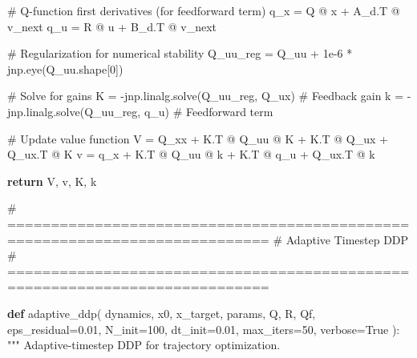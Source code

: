 \documentclass[
  letterpaper,
  DIV=11,
  numbers=noendperiod]{scrartcl}
\newenvironment{Shaded}{\begin{snugshade}}{\end{snugshade}}
\newcommand{\CommentTok}[1]{\textcolor[rgb]{0.37,0.37,0.37}{#1}}
\newcommand{\ControlFlowTok}[1]{\textcolor[rgb]{0.00,0.23,0.31}{\textbf{#1}}}
\newcommand{\DecValTok}[1]{\textcolor[rgb]{0.68,0.00,0.00}{#1}}
\newcommand{\FloatTok}[1]{\textcolor[rgb]{0.68,0.00,0.00}{#1}}
\newcommand{\KeywordTok}[1]{\textcolor[rgb]{0.00,0.23,0.31}{\textbf{#1}}}
\newcommand{\NormalTok}[1]{\textcolor[rgb]{0.00,0.23,0.31}{#1}}
\newcommand{\OperatorTok}[1]{\textcolor[rgb]{0.37,0.37,0.37}{#1}}
\newcommand{\VariableTok}[1]{\textcolor[rgb]{0.07,0.07,0.07}{#1}}
\begin{document}
\begin{Shaded}
\begin{Highlighting}[]
    \CommentTok{\# Q{-}function first derivatives (for feedforward term)}
\NormalTok{    q\_x }\OperatorTok{=}\NormalTok{ Q }\OperatorTok{@}\NormalTok{ x }\OperatorTok{+}\NormalTok{ A\_d.T }\OperatorTok{@}\NormalTok{ v\_next}
\NormalTok{    q\_u }\OperatorTok{=}\NormalTok{ R }\OperatorTok{@}\NormalTok{ u }\OperatorTok{+}\NormalTok{ B\_d.T }\OperatorTok{@}\NormalTok{ v\_next}

    \CommentTok{\# Regularization for numerical stability}
\NormalTok{    Q\_uu\_reg }\OperatorTok{=}\NormalTok{ Q\_uu }\OperatorTok{+} \FloatTok{1e{-}6} \OperatorTok{*}\NormalTok{ jnp.eye(Q\_uu.shape[}\DecValTok{0}\NormalTok{])}

    \CommentTok{\# Solve for gains}
\NormalTok{    K }\OperatorTok{=} \OperatorTok{{-}}\NormalTok{jnp.linalg.solve(Q\_uu\_reg, Q\_ux)  }\CommentTok{\# Feedback gain}
\NormalTok{    k }\OperatorTok{=} \OperatorTok{{-}}\NormalTok{jnp.linalg.solve(Q\_uu\_reg, q\_u)   }\CommentTok{\# Feedforward term}

    \CommentTok{\# Update value function}
\NormalTok{    V }\OperatorTok{=}\NormalTok{ Q\_xx }\OperatorTok{+}\NormalTok{ K.T }\OperatorTok{@}\NormalTok{ Q\_uu }\OperatorTok{@}\NormalTok{ K }\OperatorTok{+}\NormalTok{ K.T }\OperatorTok{@}\NormalTok{ Q\_ux }\OperatorTok{+}\NormalTok{ Q\_ux.T }\OperatorTok{@}\NormalTok{ K}
\NormalTok{    v }\OperatorTok{=}\NormalTok{ q\_x }\OperatorTok{+}\NormalTok{ K.T }\OperatorTok{@}\NormalTok{ Q\_uu }\OperatorTok{@}\NormalTok{ k }\OperatorTok{+}\NormalTok{ K.T }\OperatorTok{@}\NormalTok{ q\_u }\OperatorTok{+}\NormalTok{ Q\_ux.T }\OperatorTok{@}\NormalTok{ k}

    \ControlFlowTok{return}\NormalTok{ V, v, K, k}

\CommentTok{\# ============================================================================}
\CommentTok{\# Adaptive Timestep DDP}
\CommentTok{\# ============================================================================}

\KeywordTok{def}\NormalTok{ adaptive\_ddp(}
\NormalTok{    dynamics, x0, x\_target,}
\NormalTok{    params, Q, R, Qf,}
\NormalTok{    eps\_residual}\OperatorTok{=}\FloatTok{0.01}\NormalTok{,}
\NormalTok{    N\_init}\OperatorTok{=}\DecValTok{100}\NormalTok{,}
\NormalTok{    dt\_init}\OperatorTok{=}\FloatTok{0.01}\NormalTok{,}
\NormalTok{    max\_iters}\OperatorTok{=}\DecValTok{50}\NormalTok{,}
\NormalTok{    verbose}\OperatorTok{=}\VariableTok{True}
\NormalTok{):}
    \CommentTok{"""}
\CommentTok{    Adaptive{-}timestep DDP for trajectory optimization.}


\end{Highlighting}
\end{Shaded}
\end{document}
